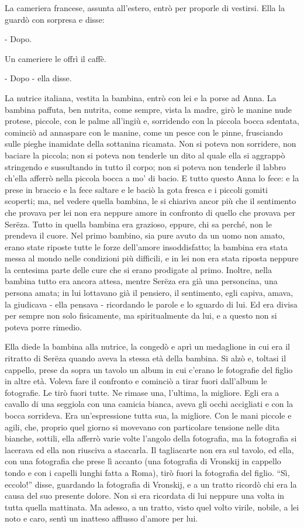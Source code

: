 La cameriera francese, assunta all'estero, entrò per proporle di vestirsi. Ella la guardò con sorpresa e disse: 

- Dopo. 

Un cameriere le offrì il caffè. 

- Dopo - ella disse. 

La nutrice italiana, vestita la bambina, entrò con lei e la porse ad Anna. La bambina paffuta, ben nutrita, come sempre, vista la madre, girò le manine nude protese, piccole, con le palme all'ingiù e, sorridendo con la piccola bocca sdentata, cominciò ad annaspare con le manine, come un pesce con le pinne, frusciando sulle pieghe inamidate della sottanina ricamata. Non si poteva non sorridere, non baciare la piccola; non si poteva non tenderle un dito al quale ella si aggrappò stringendo e sussultando in tutto il corpo; non si poteva non tenderle il labbro ch'ella afferrò nella piccola bocca a mo' di bacio. E tutto questo Anna lo fece: e la prese in braccio e la fece saltare e le baciò la gota fresca e i piccoli gomiti scoperti; ma, nel vedere quella bambina, le si chiariva ancor più che il sentimento che provava per lei non era neppure amore in confronto di quello che provava per Serëza. Tutto in quella bambina era grazioso, eppure, chi sa perché, non le prendeva il cuore. Nel primo bambino, sia pure avuto da un uomo non amato, erano state riposte tutte le forze dell'amore insoddisfatto; la bambina era stata messa al mondo nelle condizioni più difficili, e in lei non era stata riposta neppure la centesima parte delle cure che si erano prodigate al primo. Inoltre, nella bambina tutto era ancora attesa, mentre Serëza era già una personcina, una persona amata; in lui lottavano già il pensiero, il sentimento, egli capiva, amava, la giudicava - ella pensava - ricordando le parole e lo sguardo di lui. Ed era divisa per sempre non solo fisicamente, ma spiritualmente da lui, e a questo non si poteva porre rimedio. 

Ella diede la bambina alla nutrice, la congedò e aprì un medaglione in cui era il ritratto di Serëza quando aveva la stessa età della bambina. Si alzò e, toltasi il cappello, prese da sopra un tavolo un album in cui c'erano le fotografie del figlio in altre età. Voleva fare il confronto e cominciò a tirar fuori dall'album le fotografie. Le tirò fuori tutte. Ne rimase una, l'ultima, la migliore. Egli era a cavallo di una seggiola con una camicia bianca, aveva gli occhi accigliati e con la bocca sorrideva. Era un'espressione tutta sua, la migliore. Con le mani piccole e agili, che, proprio quel giorno si movevano con particolare tensione nelle dita bianche, sottili, ella afferrò varie volte l'angolo della fotografia, ma la fotografia si lacerava ed ella non riusciva a staccarla. Il tagliacarte non era sul tavolo, ed ella, con una fotografia che prese lì accanto (una fotografia di Vronskij in cappello tondo e con i capelli lunghi fatta a Roma), tirò fuori la fotografia del figlio. ``Sì, eccolo!'' disse, guardando la fotografia di Vronskij, e a un tratto ricordò chi era la causa del suo presente dolore. Non si era ricordata di lui neppure una volta in tutta quella mattinata. Ma adesso, a un tratto, visto quel volto virile, nobile, a lei noto e caro, sentì un inatteso afflusso d'amore per lui. 

